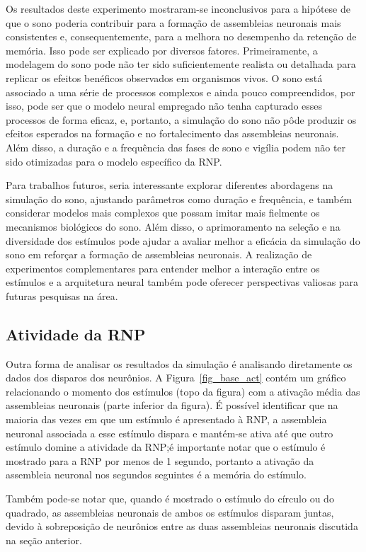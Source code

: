 Os resultados deste experimento mostraram-se inconclusivos para a hipótese de que o sono poderia contribuir para a formação de
assembleias neuronais mais consistentes e, consequentemente, para a melhora no desempenho da retenção de memória. Isso pode ser
explicado por diversos fatores. Primeiramente, a modelagem do sono pode não ter sido suficientemente realista ou detalhada para
replicar os efeitos benéficos observados em organismos vivos. O sono está associado a uma série de processos complexos e ainda
pouco compreendidos, por isso, pode ser que o  modelo neural empregado não tenha capturado esses processos de forma eficaz, e,
portanto, a simulação do sono não pôde produzir os efeitos esperados na formação e no fortalecimento das assembleias neuronais.
Além disso, a duração e a frequência das fases de sono e vigília podem não ter sido otimizadas para o modelo específico da RNP.\@

Para trabalhos futuros, seria interessante explorar diferentes abordagens na simulação do sono, ajustando parâmetros como duração
e frequência, e também considerar modelos mais complexos que possam imitar mais fielmente os mecanismos biológicos do sono. Além
disso, o aprimoramento na seleção e na diversidade dos estímulos pode ajudar a avaliar melhor a eficácia da simulação do sono em
reforçar a formação de assembleias neuronais. A realização de experimentos complementares para entender melhor a interação entre
os estímulos e a arquitetura neural também pode oferecer perspectivas valiosas para futuras pesquisas na área.


\subsection{Atividade da RNP}

Outra forma de analisar os resultados da simulação é analisando diretamente os dados dos disparos dos neurônios. A
Figura~\ref{fig_base_act} contém um gráfico relacionando o momento dos estímulos (topo da figura) com a ativação média das
assembleias neuronais (parte inferior da figura). É possível identificar que na maioria das vezes em que um estímulo é apresentado
à RNP, a assembleia neuronal associada a esse estímulo dispara e mantém-se ativa até que outro estímulo domine a atividade da
RNP;\@ é importante notar que o estímulo é mostrado para a RNP por menos de 1 segundo, portanto a ativação da assembleia neuronal
nos segundos seguintes é a memória do estímulo.

Também pode-se notar que, quando é mostrado o estímulo do círculo ou do quadrado, as assembleias neuronais de ambos os estímulos
disparam juntas, devido à sobreposição de neurônios entre as duas assembleias neuronais discutida na seção anterior.

